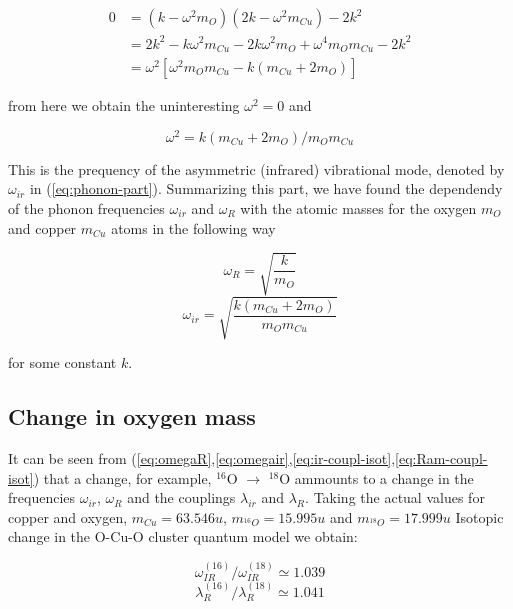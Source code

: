 \begin{equation}
\begin{split}
0 & = (k-\omega^2m_O)(2k-\omega^2m_{Cu})-2k^2 \\
  & = 2k^2-k\omega^2m_{Cu}-2k\omega^2m_O+\omega^4m_Om_{Cu}-2k^2 \\
  & = \omega^2[\omega^2m_Om_{Cu}-k(m_{Cu}+2m_O)]
\end{split}
\end{equation}

\noindent from here we obtain the uninteresting $\omega^2=0$ and

\begin{equation}
\omega^2 = k(m_{Cu}+2m_O)/m_Om_{Cu}
\end{equation}

This is the prequency of the asymmetric (infrared) vibrational mode, denoted by $\omega_{ir}$ in (\ref{eq:phonon-part}).
Summarizing this part, we have found the dependendy of the phonon frequencies $\omega_{ir}$ and $\omega_R$ with the atomic masses for the oxygen $m_O$ and copper $m_{Cu}$ atoms in the following way

\begin{equation}\label{eq:omegaR}
\omega_{R}= \sqrt{\frac{k}{m_O}}
\end{equation}
\begin{equation}\label{eq:omegair}
\omega_{ir} = \sqrt{\frac{k(m_{Cu}+2m_O)}{m_Om_{Cu}}}
\end{equation}

\noindent for some constant $k$.

\subsection{Change in oxygen mass}

It can be seen from (\ref{eq:omegaR},\ref{eq:omegair},\ref{eq:ir-coupl-isot},\ref{eq:Ram-coupl-isot}) that a change, for example, $^{16}$O $\rightarrow$ $^{18}$O ammounts to a change in the frequencies  $\omega_{ir}$, $\omega_R$ and the couplings $\lambda_{ir}$ and $\lambda_R$. Taking the actual values for copper and oxygen, $m_{Cu}=63.546u$, $m_{^{16}O}=15.995u$ and $m_{^{18}O}=17.999u$ Isotopic change in the O-Cu-O cluster quantum model we obtain:

\begin{equation}\label{eq:omega-ir-isot}
\omega^{(16)}_{IR} / \omega^{(18)}_{IR} \simeq 1.039
\end{equation}
\begin{equation}\label{eq:lambda-ir-isot}
\lambda_R^{(16)} / \lambda_R^{(18)} \simeq 1.041
\end{equation}

